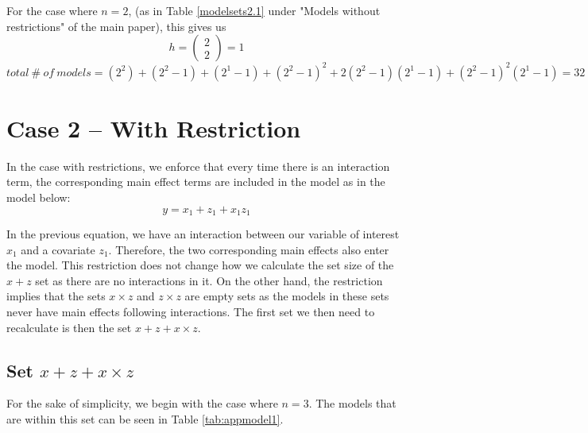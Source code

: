For the case where $n=2$, (as in Table \ref{modelsets2.1} under "Models without restrictions" of the main paper), this gives us
\[h=\left( \begin{array}{c}
2 \\ 
2 \end{array}
\right)=1\] 
$total \ \#\ of\ models=\left(2^2\right)+\left(2^2-1\right)+\left(2^1-1\right)+{\left(2^2-1\right)}^2+2\left(2^2-1\right)\left(2^1-1\right)+{\left(2^2-1\right)}^2\left(2^1-1\right)=32$ 

\section{Case 2 – With Restriction}

In the case with restrictions, we enforce that every time there is an interaction term, the corresponding main effect terms are included in the model as in the model below:
\[y=x_1+z_1+x_1z_1\] 

In the previous equation, we have an interaction between our variable of interest $x_1$ and a covariate $z_1$. Therefore, the two corresponding main effects also enter the model. This restriction does not change how we calculate the set size of the $x + z$ set as there are no interactions in it. On the other hand,  the restriction implies that the sets $x \times z$ and $z \times z$ are empty sets as the models in these sets never have main effects following interactions. The first set we then need to recalculate is then the set $x + z + x \times z$.

\subsection{Set $x + z + x \times z$}
For the sake of simplicity, we begin with the case where $n=3$. The models that are within this set can be seen in Table \ref{tab:appmodel1}. \\

